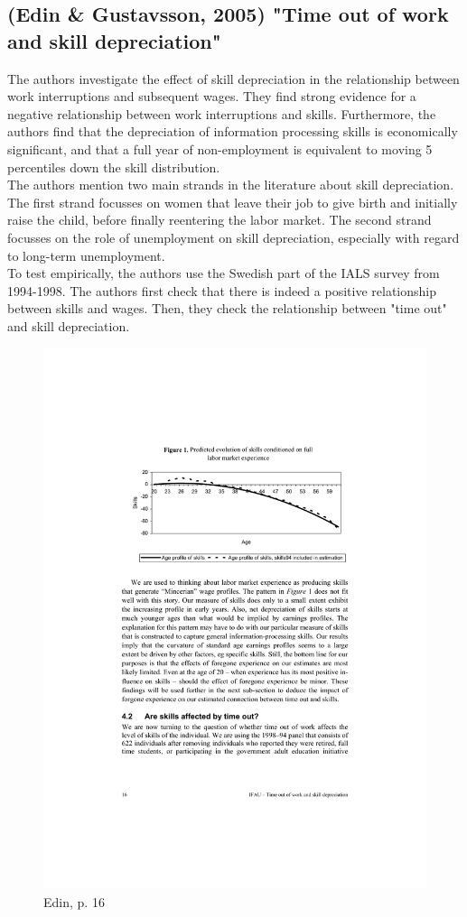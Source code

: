 \documentclass[12pt,a4paper]{article}
\begin{document}
  \subsection{(Edin \& Gustavsson, 2005) "Time out of work and skill depreciation"} %
  \label{sub:edin}
  The authors investigate the effect of skill depreciation in the relationship between work interruptions and 
  subsequent wages. They find strong evidence for a negative relationship between work interruptions and skills.
  Furthermore, the authors find that the depreciation of information processing skills is economically significant,
  and that a full year of non-employment is equivalent to moving 5 percentiles down the skill distribution.\\
  The authors mention two main strands in the literature about skill depreciation. The first strand focusses on
  women that leave their job to give birth and initially raise the child, before finally reentering the labor
  market. The second strand focusses on the role of unemployment on skill depreciation, especially with regard
  to long-term unemployment.\\
  To test empirically, the authors use the Swedish part of the IALS survey from 1994-1998. The authors first check
  that there is indeed a positive relationship between skills and wages. Then, they check the relationship between
  "time out" and skill depreciation.\\
  
  \begin{figure}[ht]
        \centering
        \includegraphics[width=12cm]{edin_age.pdf}
        \caption{Edin, p. 16}
        \label{edin_age}
  \end{figure}
\end{document}
